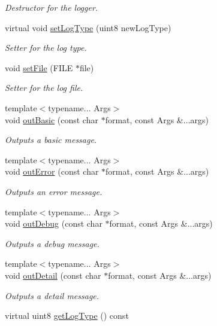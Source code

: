 \begin{DoxyCompactItemize}
\begin{DoxyCompactList}\small\item\em Destructor for the logger. \end{DoxyCompactList}\item 
virtual void \hyperlink{class_a_p_i_kachu_1_1_logger_a71f7b72c8f52540468afd1eb0a9079cf}{set\+Log\+Type} (uint8 new\+Log\+Type)
\begin{DoxyCompactList}\small\item\em Setter for the log type. \end{DoxyCompactList}\item 
void \hyperlink{class_a_p_i_kachu_1_1_logger_a70dc2e7e6240a77054d33ca22b0ef1f9}{set\+File} (F\+I\+LE $\ast$file)
\begin{DoxyCompactList}\small\item\em Setter for the log file. \end{DoxyCompactList}\item 
{\footnotesize template$<$typename... Args$>$ }\\void \hyperlink{class_a_p_i_kachu_1_1_logger_ad74e704ae848ac5113e9a9e28337d455}{out\+Basic} (const char $\ast$format, const Args \&...args)
\begin{DoxyCompactList}\small\item\em Outputs a basic message. \end{DoxyCompactList}\item 
{\footnotesize template$<$typename... Args$>$ }\\void \hyperlink{class_a_p_i_kachu_1_1_logger_a6cbf04b8db00bcb707981722d67e1a8e}{out\+Error} (const char $\ast$format, const Args \&...args)
\begin{DoxyCompactList}\small\item\em Outputs an error message. \end{DoxyCompactList}\item 
{\footnotesize template$<$typename... Args$>$ }\\void \hyperlink{class_a_p_i_kachu_1_1_logger_a42e6ed2289a67d7c9b04558940e385e3}{out\+Debug} (const char $\ast$format, const Args \&...args)
\begin{DoxyCompactList}\small\item\em Outputs a debug message. \end{DoxyCompactList}\item 
{\footnotesize template$<$typename... Args$>$ }\\void \hyperlink{class_a_p_i_kachu_1_1_logger_ac310be8ea14351cba3c21b4ba770531a}{out\+Detail} (const char $\ast$format, const Args \&...args)
\begin{DoxyCompactList}\small\item\em Outputs a detail message. \end{DoxyCompactList}\item 
virtual uint8 \hyperlink{class_a_p_i_kachu_1_1_logger_a2ad6555c3e1c745da1aa824a9c59ae0c}{get\+Log\+Type} () const \hypertarget{class_a_p_i_kachu_1_1_logger_a2ad6555c3e1c745da1aa824a9c59ae0c}{}\label{class_a_p_i_kachu_1_1_logger_a2ad6555c3e1c745da1aa824a9c59ae0c}


\end{DoxyCompactItemize}
